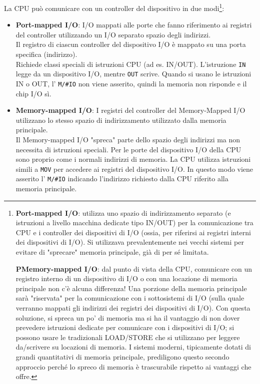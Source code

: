 \documentclass{article}
\begin{document}
    La CPU può comunicare con un controller del dispositivo in due modi\footnote{\textbf{Port-mapped I/O}: utilizza uno spazio di indirizzamento separato (e istruzioni a livello macchina dedicate tipo IN/OUT) per la comunicazione tra CPU e i controller dei dispositivi di I/O (ossia, per riferirsi ai registri interni dei dispositivi di I/O). Si utilizzava prevalentemente nei vecchi sistemi per evitare di "sprecare" memoria principale, già di per sé limitata.\par
    \textbf{PMemory-mapped I/O}: dal punto di vista della CPU, comunicare con un registro interno di un dispositivo di I/O o con una locazione di memoria principale non c'è alcuna differenza! Una porzione della memoria principale sarà "riservata" per la comunicazione con i sottosistemi di I/O (sulla quale verranno mappati gli indirizzi dei registri dei dispositivi di I/O). Con questa soluzione, si spreca un po' di memoria ma si ha il vantaggio di non dover prevedere istruzioni dedicate per comunicare con i dispositivi di I/O; si possono usare le tradizionali LOAD/STORE che si utilizzano per leggere da/scrivere su locazioni di memoria. I sistemi moderni, tipicamente dotati di grandi quantitativi di memoria principale, prediligono questo secondo approccio perché lo spreco di memoria è trascurabile rispetto ai vantaggi che offre.}:
    \begin{itemize}
        \item \textbf{Port-mapped I/O}: I/O mappati alle porte che fanno riferimento ai registri del controller utilizzando un I/O separato
        spazio degli indirizzi. \\Il registro di ciascun controller del dispositivo I/O è mappato su una porta specifica (indirizzo).\\
        Richiede classi speciali di istruzioni CPU (ad es. IN/OUT). L'istruzione \texttt{IN} legge da un dispositivo I/O, mentre \texttt{OUT} scrive. Quando si usano le istruzioni IN o OUT, l' \texttt{M/\#IO} non viene asserito, quindi la memoria non risponde e il chip I/O sì.
        \item \textbf{Memory-mapped I/O}: I registri del controller del Memory-Mapped I/O utilizzano lo stesso spazio di indirizzamento utilizzato dalla memoria principale.\\Il Memory-mapped I/O "spreca" parte dello spazio degli indirizzi ma non necessita di istruzioni speciali. Per le porte del dispositivo I/O della CPU sono proprio come i normali indirizzi di memoria. La CPU utilizza istruzioni simili a \texttt{MOV} per accedere ai registri del dispositivo I/O. In questo modo viene asserito l' \texttt{M/\#IO} indicando l'indirizzo richiesto dalla CPU riferito alla memoria principale.
    \end{itemize}
\end{document}
